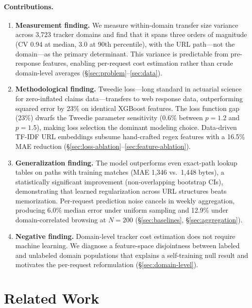 \documentclass[sigconf,nonacm]{acmart}
\newcommand{\numdomains}{3{,}723\xspace}
\begin{document}
\paragraph{Contributions.}
\begin{enumerate}
    \item \textbf{Measurement finding.} We measure within-domain transfer size variance across \numdomains tracker domains and find that it spans three orders of magnitude (CV 0.94 at median, 3.0 at 90th percentile), with the URL path---not the domain---as the primary determinant. This variance is predictable from pre-response features, enabling per-request cost estimation rather than crude domain-level averages (\S\ref{sec:problem}--\ref{sec:data}).

    \item \textbf{Methodological finding.} Tweedie loss---long standard in actuarial science for zero-inflated claims data---transfers to web response data, outperforming squared error by 23\% on identical XGBoost features. The loss function gap (23\%) dwarfs the Tweedie parameter sensitivity (0.6\% between $p=1.2$ and $p=1.5$), making loss selection the dominant modeling choice. Data-driven TF-IDF URL embeddings subsume hand-crafted regex features with a 16.5\% MAE reduction (\S\ref{sec:loss-ablation}--\ref{sec:feature-ablation}).

    \item \textbf{Generalization finding.} The model outperforms even exact-path lookup tables on paths with training matches (MAE 1,346 vs.\ 1,448 bytes), a statistically significant improvement (non-overlapping bootstrap CIs), demonstrating that learned regularization across URL structures beats memorization. Per-request prediction noise cancels in weekly aggregation, producing 6.0\% median error under uniform sampling and 12.9\% under domain-correlated browsing at $N\!=\!200$ (\S\ref{sec:baselines}, \S\ref{sec:aggregation}).

    \item \textbf{Negative finding.} Domain-level tracker cost estimation does not require machine learning. We diagnose a feature-space disjointness between labeled and unlabeled domain populations that explains a self-training null result and motivates the per-request reformulation (\S\ref{sec:domain-level}).
\end{enumerate}

\section{Related Work}
\label{sec:related}
\end{document}
